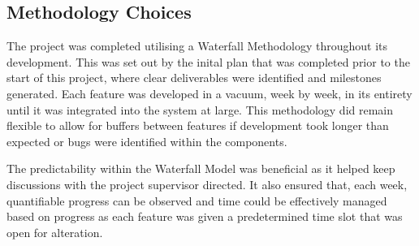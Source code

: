 \subsection{Methodology Choices}\label{subsec:methodology}
The project was completed utilising a Waterfall Methodology throughout its development. This was set out by the inital plan that was completed prior to the start of this project, where clear deliverables were identified and milestones generated. Each feature was developed in a vacuum, week by week, in its entirety until it was integrated into the system at large. This methodology did remain flexible to allow for buffers between features if development took longer than expected or bugs were identified within the components.

The predictability within the Waterfall Model was beneficial as it helped keep discussions with the project supervisor directed. It also ensured that, each week, quantifiable progress can be observed and time could be effectively managed based on progress as each feature was given a predetermined time slot that was open for alteration.